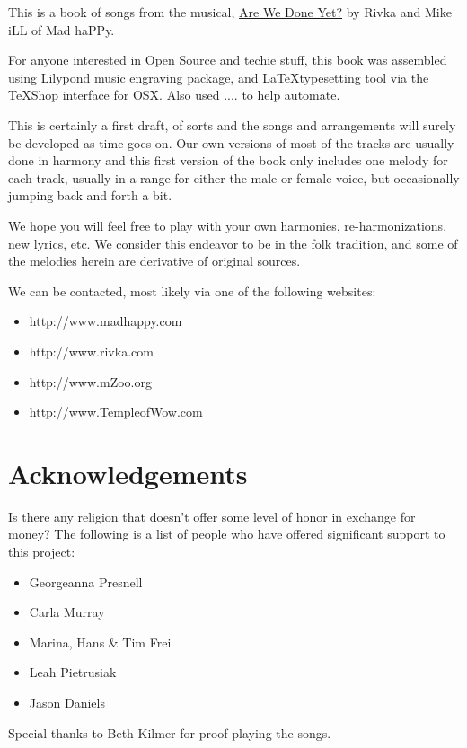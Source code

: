 \documentclass[a5paper,twoside,9pt]{extbook}
\newtheorem{I Surrender}{Definition}
\begin{document}
This is a book of songs from the musical, \underline{Are We Done Yet?} by Rivka and Mike iLL of Mad haPPy.

For anyone interested in Open Source and techie stuff, this book was assembled using Lilypond music engraving package, and \LaTeX  typesetting tool via the TeXShop interface for OSX. Also used .... to help automate.

This is certainly a first draft, of sorts and the songs and arrangements will surely be developed as time goes on. Our own versions of most of the tracks are usually done in harmony and this first version of the book only includes one melody for each track, usually in a range for either the male or female voice, but occasionally jumping back and forth a bit.

We hope you will feel free to play with your own harmonies, re-harmonizations, new lyrics, etc. We consider this endeavor to be in the folk tradition, and some of the melodies herein are derivative of original sources.

We can be contacted, most likely via one of the following websites: \\
\begin{itemize}
\item http://www.madhappy.com 
\item http://www.rivka.com
\item http://www.mZoo.org
\item http://www.TempleofWow.com
\end{itemize}
\pagebreak{}

\section{Acknowledgements}

Is there any religion that doesn't offer some level of honor in exchange for money?
\newline
The following is a list of people who have offered significant support to this project:
  
\begin{itemize}   
  \item Georgeanna Presnell
  \item Carla Murray
  \item Marina, Hans \& Tim Frei
  \item Leah Pietrusiak
  \item Jason Daniels
\end{itemize}    

  
  Special thanks to Beth Kilmer for proof-playing the songs.
   \newline
   
\end{document}
